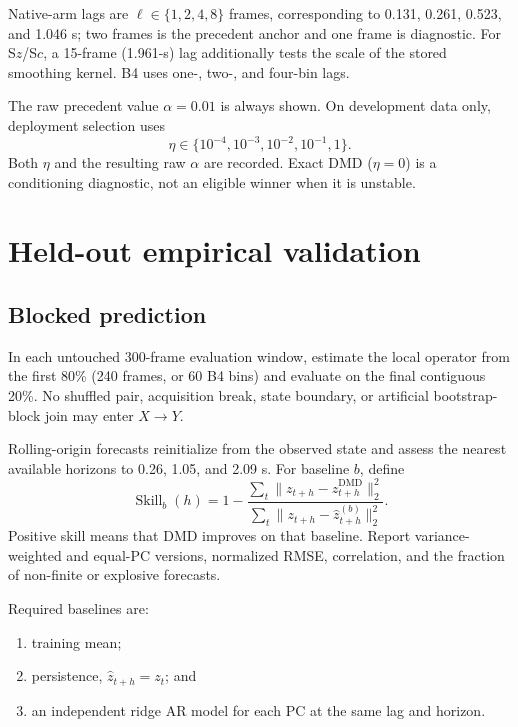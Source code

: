 \documentclass[11pt,a4paper]{article}
\begin{document}
Native-arm lags are $\ell\in\{1,2,4,8\}$ frames, corresponding to 0.131, 0.261,
0.523, and 1.046 s; two frames is the precedent anchor and one frame is diagnostic.
For S$z$/S$c$, a 15-frame (1.961-s) lag additionally tests the scale of the stored
smoothing kernel. B4 uses one-, two-, and four-bin lags.

The raw precedent value $\alpha=0.01$ is always shown. On development data only,
deployment selection uses
\begin{equation*}
  \eta\in\{10^{-4},10^{-3},10^{-2},10^{-1},1\}.
\end{equation*}
Both $\eta$ and the resulting raw $\alpha$ are recorded. Exact DMD ($\eta=0$)
is a conditioning diagnostic, not an eligible winner when it is unstable.

\section{Held-out empirical validation}

\subsection{Blocked prediction}

In each untouched 300-frame evaluation window, estimate the local operator from
the first 80\% (240 frames, or 60 B4 bins) and evaluate on the final contiguous
20\%. No shuffled pair, acquisition break, state boundary, or artificial
bootstrap-block join may enter $X\rightarrow Y$.

Rolling-origin forecasts reinitialize from the observed state and assess the
nearest available horizons to 0.26, 1.05, and 2.09 s. For baseline $b$, define
\begin{equation}
  \operatorname{Skill}_b(h)=
  1-\frac{\sum_t\lVert z_{t+h}-\widehat z^{\mathrm{DMD}}_{t+h}\rVert_2^2}
          {\sum_t\lVert z_{t+h}-\widehat z^{(b)}_{t+h}\rVert_2^2}.
\end{equation}
Positive skill means that DMD improves on that baseline. Report variance-weighted
and equal-PC versions, normalized RMSE, correlation, and the fraction of
non-finite or explosive forecasts.

Required baselines are:

\begin{enumerate}
  \item training mean;
  \item persistence, $\widehat z_{t+h}=z_t$; and
  \item an independent ridge AR model for each PC at the same lag and horizon.
\end{enumerate}
\end{document}
